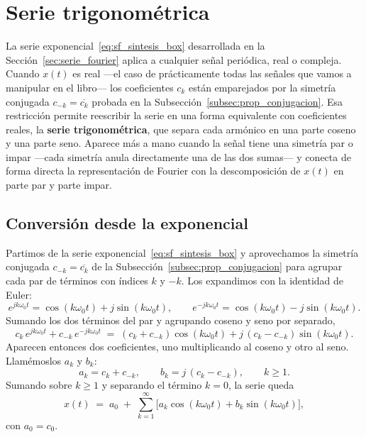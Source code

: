 \documentclass[class=book, crop=false]{standalone}
\begin{document}
\setcounter{chapter}{5}
\section{Serie trigonométrica}
\label{sec:serie_trigonometrica}

La serie exponencial~\eqref{eq:sf_sintesis_box} desarrollada
en la Sección~\ref{sec:serie_fourier} aplica a cualquier señal
periódica, real o compleja. Cuando $x(t)$ es real ---el caso de
prácticamente todas las señales que vamos a manipular en el
libro--- los coeficientes $c_k$ están emparejados por la simetría
conjugada $c_{-k} = \overline{c_k}$ probada en la
Subsección~\ref{subsec:prop_conjugacion}. Esa restricción permite
reescribir la serie en una forma equivalente con coeficientes
reales, la \textbf{serie trigonométrica}, que separa cada armónico
en una parte coseno y una parte seno. Aparece más a mano cuando la
señal tiene una simetría par o impar ---cada simetría anula
directamente una de las dos sumas--- y conecta de forma directa la
representación de Fourier con la descomposición de $x(t)$ en parte
par y parte impar.

\subsection{Conversión desde la exponencial}
\label{subsec:trig_conversion}

Partimos de la serie exponencial~\eqref{eq:sf_sintesis_box} y
aprovechamos la simetría conjugada $c_{-k} = \overline{c_k}$
de la Subsección~\ref{subsec:prop_conjugacion} para agrupar cada
par de términos con índices $k$ y $-k$. Los expandimos con la
identidad de Euler:
\[
    e^{jk\omega_0 t} = \cos(k\omega_0 t) + j\sin(k\omega_0 t),
    \qquad
    e^{-jk\omega_0 t} = \cos(k\omega_0 t) - j\sin(k\omega_0 t).
\]
Sumando los dos términos del par y agrupando coseno y seno por
separado,
\begin{equation*}
    c_k\,e^{jk\omega_0 t} + c_{-k}\,e^{-jk\omega_0 t}
    \;=\; (c_k + c_{-k})\cos(k\omega_0 t)
        + j\,(c_k - c_{-k})\sin(k\omega_0 t).
\end{equation*}
Aparecen entonces dos coeficientes, uno multiplicando al coseno y
otro al seno. Llamémoslos $a_k$ y $b_k$:
\begin{equation*}
    a_k = c_k + c_{-k},
    \qquad
    b_k = j\,(c_k - c_{-k}),
    \qquad k \geq 1.
\end{equation*}
Sumando sobre $k\geq 1$ y separando el término $k = 0$, la serie
queda
\begin{equation}
    x(t) \;=\; a_0 \;+\; \sum_{k=1}^{\infty}
        \bigl[a_k\cos(k\omega_0 t) + b_k\sin(k\omega_0 t)\bigr],
    \label{eq:sf_trig}
\end{equation}
con $a_0 = c_0$.
\end{document}
